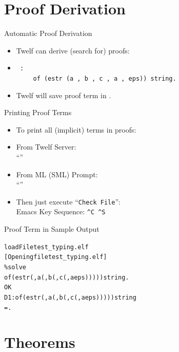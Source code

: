 \documentclass{beamer}
\begin{document}
\section{Proof Derivation}

\begin{frame}{Automatic Proof Derivation}
\begin{itemize}
\item Twelf can derive (search for) proofs:

\item
\texttt{ :} \\
$\qquad$ \texttt{of (estr (a , b , c , a , eps)) string.}

\item Twelf will save proof term in \texttt{}.
\end{itemize}
\end{frame}


\begin{frame}{Printing Proof Terms}
\begin{itemize}
\item To print all (implicit) terms in proofs:
\item From Twelf Server: \\
``\texttt{}''
\item From ML (SML) Prompt: \\
``\texttt{}''
\item Then just execute ``\texttt{Check File}'': \\
Emacs Key Sequence: \texttt{\^{}C \^{}S}
\end{itemize}
\end{frame}


\begin{frame}[containsverbatim]{Proof Term in Sample Output}
\begin{alltt}
loadFile test_typing.elf
[Opening file test_typing.elf]
\%solve 
of (estr (, a (, b (, c (, a eps))))) string.
 OK
D1 : of (estr (, a (, b (, c (, a eps))))) string
   = .
\end{alltt}
\end{frame}


\section{Theorems}
\end{document}
